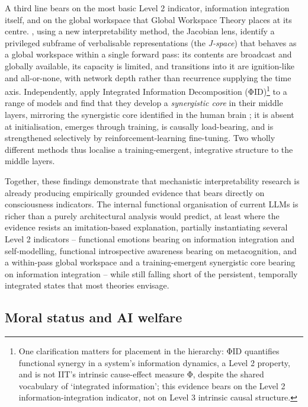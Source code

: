 \documentclass[11pt, a4paper, onecolumn, gdm]{google}
\newcounter{none}
\begin{document}
A third line bears on the most basic Level 2 indicator, information integration itself, and on the global workspace that Global Workspace Theory places at its centre.
\citet{gurnee2026}, using a new interpretability method, the Jacobian lens, identify a privileged subframe of verbalisable representations (the \emph{J-space}) that behaves as a global workspace within a single forward pass: its contents are broadcast and globally available, its capacity is limited, and transitions into it are ignition-like and all-or-none, with network depth rather than recurrence supplying the time axis.
Independently, \citet{urbinarodriguez2026} apply Integrated Information Decomposition (ΦID)\footnote{One clarification matters for placement in the hierarchy: ΦID quantifies functional synergy in a system's information dynamics, a Level 2 property, and is not IIT's intrinsic cause-effect measure Φ, despite the shared vocabulary of `integrated information'; this evidence bears on the Level 2 information-integration indicator, not on Level 3 intrinsic causal structure.} to a range of models and find that they develop a \emph{synergistic core} in their middle layers, mirroring the synergistic core identified in the human brain \citep{luppi2022,luppi2024}; it is absent at initialisation, emerges through training, is causally load-bearing, and is strengthened selectively by reinforcement-learning fine-tuning.
Two wholly different methods thus localise a training-emergent, integrative structure to the middle layers.

Together, these findings demonstrate that mechanistic interpretability research is already producing empirically grounded evidence that bears directly on consciousness indicators.
The internal functional organisation of current LLMs is richer than a purely architectural analysis would predict, at least where the evidence resists an imitation-based explanation, partially instantiating several Level 2 indicators -- functional emotions bearing on information integration and self-modelling, functional introspective awareness bearing on metacognition, and a within-pass global workspace and a training-emergent synergistic core bearing on information integration -- while still falling short of the persistent, temporally integrated states that most theories envisage.

\subsection{Moral status and AI welfare}\label{moral-status-and-ai-welfare}
\end{document}
